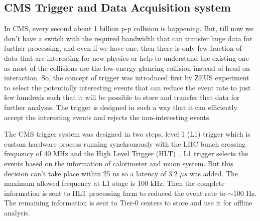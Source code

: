 \subsection{CMS Trigger and Data Acquisition system} %
\label{sub:cms_trigger_and_data_acquisition_system}
In CMS, every second about 1 billion p-p collision is happening. But, till now we don't have a switch with the required bandwidth that can transfer huge data for further processing, and even if we have one, then there is only few fraction of data that are interesting for new physics or help to understand the existing one as most of the collisions are the low-energy glancing collision instead of head on interaction. So, the concept of trigger was introduced first by ZEUS experiment~\cite{ZEUSCollaboration1993} to select the potentially interesting events that can reduce the event rate to just few hundreds such that it will be possible to store and transfer that data for further analysis. The trigger is designed in such a way that it can efficiently accept the interesting events and rejects the non-interesting events.

The CMS trigger system was designed in two steps, level 1 (L1) trigger which is custom hardware process running synchronously with the LHC bunch crossing frequency of 40 MHz and the High Level Trigger (HLT)~\cite{paper:JINST:CMSCollaboration}. L1 trigger selects the events based on the information of calorimeter and muon system. But this decision can't take place within 25 ns so a latency of 3.2 $\mu s$ was added. The maximum allowed frequency at L1 stage is 100 kHz. Then the complete information is sent to HLT processing farm to reduced the event rate to $\sim$100 Hz. The remaining information is sent to Tier-0 centers to store and use it for offline analysis.





